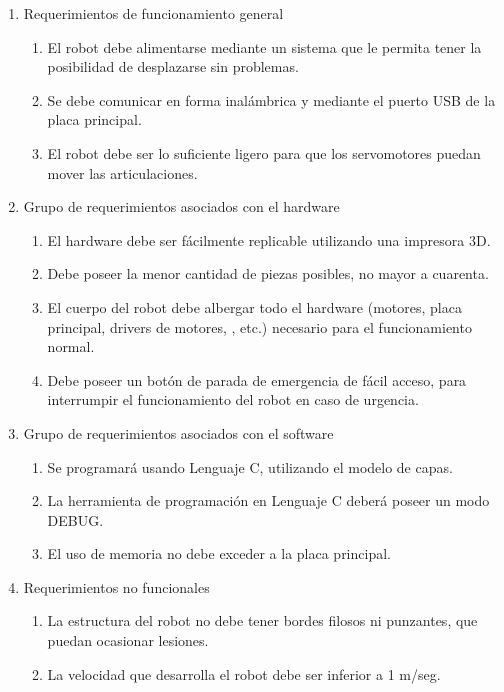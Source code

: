 \documentclass[
11pt, %
codirector, %
]{charter}
\begin{document}
\begin{enumerate}
\item Requerimientos de funcionamiento general
	\begin{enumerate}
	\item El robot debe alimentarse mediante un sistema que le permita tener la posibilidad de desplazarse sin problemas.
	\item Se debe comunicar en forma inalámbrica y mediante el puerto USB de la placa principal. 
	\item El robot debe ser lo suficiente ligero para que los servomotores puedan mover las articulaciones.
	\end{enumerate}

\vspace{0.3cm} 

\item Grupo de requerimientos asociados con el hardware
	\begin{enumerate}
	\item El hardware debe ser fácilmente replicable utilizando una impresora 3D.
	\item Debe poseer la menor cantidad de piezas posibles, no mayor a cuarenta. 
	\item El cuerpo del robot debe albergar todo el hardware (motores, placa principal, drivers de motores, , etc.) necesario para el funcionamiento normal.
	\item Debe poseer un botón de parada de emergencia de fácil acceso, para interrumpir el funcionamiento del robot en caso de urgencia.
	\end{enumerate}
	
\vspace{0.3cm}	
	
\item Grupo de requerimientos asociados con el software
	\begin{enumerate}
	\item Se programará usando Lenguaje C, utilizando el modelo de capas.
	\item La herramienta de programación en Lenguaje C deberá poseer un modo DEBUG.
	\item El uso de memoria no debe exceder a la placa principal.
	\end{enumerate}
	
\vspace{0.3cm}
	
\item Requerimientos no funcionales
	\begin{enumerate}
	\item La estructura del robot no debe tener bordes filosos ni punzantes, que puedan ocasionar lesiones. 
	\item La velocidad que desarrolla el robot debe ser inferior a 1 m/seg.
	\end{enumerate}
	

\end{enumerate}
\end{document}
